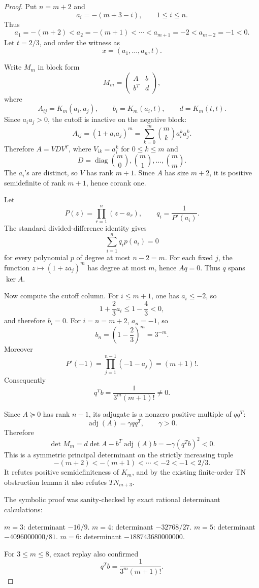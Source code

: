 \documentclass[11pt]{article}
\numberwithin{equation}{section}
\theoremstyle{definition}
\theoremstyle{remark}
\newcommand{\1}{\mathbf 1}
\begin{document}
\begin{proof}
Put \(n=m+2\) and
\[
a_i=-(m+3-i),\qquad 1\le i\le n.
\]
Thus
\[
a_1=-(m+2)<a_2=-(m+1)<\cdots<a_{m+1}=-2<a_{m+2}=-1<0.
\]
Let \(t=2/3\), and order the witness as
\[
x=(a_1,\ldots,a_n,t).
\]

Write \(M_m\) in block form
\[
M_m=\begin{pmatrix}A&b\\ b^T&d\end{pmatrix},
\]
where
\[
A_{ij}=K_m(a_i,a_j),\qquad b_i=K_m(a_i,t),\qquad d=K_m(t,t).
\]
Since \(a_i a_j>0\), the cutoff is inactive on the negative block:
\[
A_{ij}=(1+a_i a_j)^m
=\sum_{k=0}^m \binom{m}{k}a_i^k a_j^k.
\]
Therefore \(A=VDV^T\), where \(V_{ik}=a_i^k\) for \(0\le k\le m\) and
\[
D=\operatorname{diag}\binom{m}{0},\binom{m}{1},\ldots,\binom{m}{m}.
\]
The \(a_i\)'s are distinct, so \(V\) has rank \(m+1\). Since \(A\) has size
\(m+2\), it is positive semidefinite of rank \(m+1\), hence corank one.

Let
\[
P(z)=\prod_{r=1}^n(z-a_r),\qquad q_i=\frac{1}{P'(a_i)}.
\]
The standard divided-difference identity gives
\[
\sum_{i=1}^n q_i p(a_i)=0
\]
for every polynomial \(p\) of degree at most \(n-2=m\). For each fixed \(j\),
the function \(z\mapsto(1+za_j)^m\) has degree at most \(m\), hence \(Aq=0\).
Thus \(q\) spans \(\ker A\).

Now compute the cutoff column. For \(i\le m+1\), one has \(a_i\le -2\), so
\[
1+\frac23 a_i\le 1-\frac43<0,
\]
and therefore \(b_i=0\). For \(i=n=m+2\), \(a_n=-1\), so
\[
b_n=\left(1-\frac23\right)^m=3^{-m}.
\]
Moreover
\[
P'(-1)=\prod_{j=1}^{n-1}(-1-a_j)=(m+1)!.
\]
Consequently
\[
q^T b=\frac{1}{3^m(m+1)!}\ne0.
\]

Since \(A\succeq0\) has rank \(n-1\), its adjugate is a nonzero positive
multiple of \(qq^T\):
\[
\operatorname{adj}(A)=\gamma qq^T,\qquad \gamma>0.
\]
Therefore
\[
\det M_m
=d\det A-b^T\operatorname{adj}(A)b
=-\gamma(q^Tb)^2<0.
\]
This is a symmetric principal determinant on the strictly increasing tuple
\[
-(m+2)<-(m+1)<\cdots<-2<-1<2/3.
\]
It refutes positive semidefiniteness of \(K_m\), and by the existing
finite-order TN obstruction lemma it also refutes \(TN_{m+3}\).

The symbolic proof was sanity-checked by exact rational determinant
calculations:

\(m=3\): determinant \(-16/9\).
\(m=4\): determinant \(-32768/27\).
\(m=5\): determinant \(-4096000000/81\).
\(m=6\): determinant \(-188743680000000\).

For \(3\le m\le8\), exact replay also confirmed
\[
q^T b=\frac{1}{3^m(m+1)!}.
\]


\end{proof}
\end{document}
